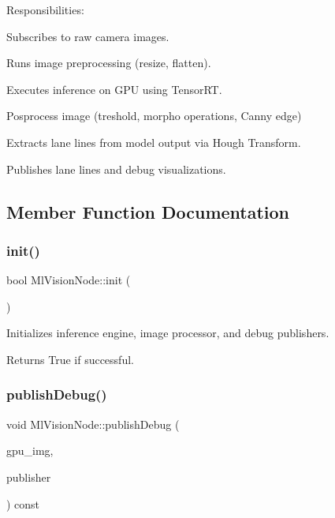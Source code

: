 Responsibilities\+:
\begin{DoxyItemize}
\item Subscribes to raw camera images.
\item Runs image preprocessing (resize, flatten).
\item Executes inference on G\+PU using Tensor\+RT.
\item Posprocess image (treshold, morpho operations, Canny edge)
\item Extracts lane lines from model output via Hough Transform.
\item Publishes lane lines and debug visualizations. 
\end{DoxyItemize}

\subsection{Member Function Documentation}
\mbox{\label{classMlVisionNode_aadb64eb869ae730fa6766f95d3c352a2}} 
\subsubsection{\texorpdfstring{init()}{init()}}
{\footnotesize\ttfamily bool Ml\+Vision\+Node\+::init (\begin{DoxyParamCaption}{ }\end{DoxyParamCaption})}



Initializes inference engine, image processor, and debug publishers. 

\begin{DoxyReturn}{Returns}
True if successful. 
\end{DoxyReturn}
\mbox{\label{classMlVisionNode_a56422aa2b6f2843226bdeff85ebe785f}} 
\subsubsection{\texorpdfstring{publish\+Debug()}{publishDebug()}}
{\footnotesize\ttfamily void Ml\+Vision\+Node\+::publish\+Debug (\begin{DoxyParamCaption}\item[{cv\+::cuda\+::\+Gpu\+Mat \&}]{gpu\+\_\+img,  }\item[{image\+\_\+transport\+::\+Publisher \&}]{publisher }\end{DoxyParamCaption}) const\hspace{0.3cm}{\ttfamily [private]}}



